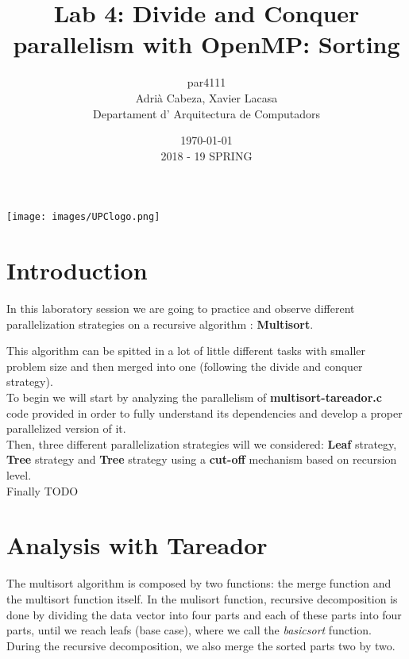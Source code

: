 \documentclass[12]{article}
\author{par4111 \\ Adrià Cabeza, Xavier Lacasa \\ Departament d' Arquitectura de Computadors}
\title{Lab 4: Divide and Conquer parallelism with OpenMP: Sorting }
\date{\today \\ 2018 - 19 SPRING}
\begin{document}
\maketitle

\vspace*{\fill}
\begin{center}
\texttt{[image: images/UPClogo.png]}
\end{center}
\newpage
\tableofcontents
\newpage
\section{Introduction}
In this laboratory session we are going to practice and observe different parallelization strategies on a recursive algorithm : \textbf{Multisort}.

This algorithm can be spitted in a lot of little different tasks with smaller problem size and then merged into one (following the divide and conquer strategy).
\\
To begin we will start by analyzing the parallelism of \textbf{multisort-tareador.c} code provided in order to fully understand its dependencies and develop a proper parallelized version of it.
\\
Then, three different parallelization strategies will we considered: \textbf{Leaf} strategy, \textbf{Tree} strategy and \textbf{Tree} strategy using a \textbf{cut-off} mechanism based on recursion level. 
\\
Finally TODO 


\section{Analysis with Tareador}
The multisort algorithm is composed by two functions: the merge function and the multisort function itself.
In the mulisort function, recursive decomposition is done by dividing the data vector into four parts and each of these parts into four parts, until we reach leafs (base case), where we call the \textit{basicsort} function.  During the recursive decomposition, we also merge the sorted parts two by two. 
\end{document}
